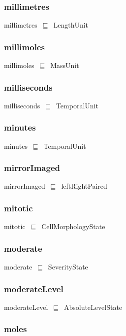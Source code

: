\documentclass{article}
\begin{document}
\subsubsection*{millimetres}

millimetres~\ensuremath{\sqsubseteq}~LengthUnit~

\subsubsection*{millimoles}

millimoles~\ensuremath{\sqsubseteq}~MassUnit~

\subsubsection*{milliseconds}

milliseconds~\ensuremath{\sqsubseteq}~TemporalUnit~

\subsubsection*{minutes}

minutes~\ensuremath{\sqsubseteq}~TemporalUnit~

\subsubsection*{mirrorImaged}

mirrorImaged~\ensuremath{\sqsubseteq}~leftRightPaired~

\subsubsection*{mitotic}

mitotic~\ensuremath{\sqsubseteq}~CellMorphologyState~

\subsubsection*{moderate}

moderate~\ensuremath{\sqsubseteq}~SeverityState~

\subsubsection*{moderateLevel}

moderateLevel~\ensuremath{\sqsubseteq}~AbsoluteLevelState~

\subsubsection*{moles}
\end{document}
